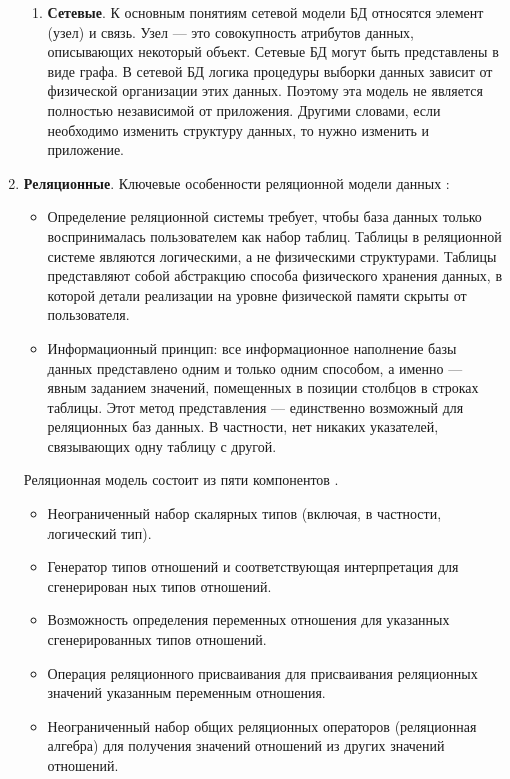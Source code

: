 \begin{enumerate}[label*=\arabic*.]
\begin{enumerate}[label*=\arabic*.]
		\item \textbf{Сетевые}. \newline
		К основным понятиям сетевой модели БД относятся элемент (узел) и связь. Узел --- это совокупность атрибутов данных, описывающих некоторый объект. Сетевые БД могут быть представлены в виде графа. В сетевой БД логика процедуры выборки данных зависит от физической организации этих данных. Поэтому эта модель не является полностью независимой от приложения. Другими словами, если необходимо изменить структуру данных, то нужно изменить и приложение.
		
	\end{enumerate}
	
	\item \textbf{Реляционные}. \newline
	Ключевые особенности реляционной модели данных \cite{Date_old}:
	
	\begin{itemize}[label*=---]
		\item  Определение реляционной системы требует, чтобы база данных только воспринималась пользователем как набор таблиц. Таблицы в реляционной системе являются логическими, а не физическими структурами. Таблицы представляют собой абстракцию способа физического хранения данных, в которой детали реализации на уровне физической памяти скрыты от пользователя.
		\item  Информационный принцип: все информационное наполнение базы данных представлено одним и только одним способом, а именно --- явным заданием значений, помещенных в позиции столбцов в строках таблицы. Этот метод представления --- единственно возможный для реляционных баз данных. В частности, нет никаких указателей, связывающих одну таблицу с другой.
		
	\end{itemize}
	
	Реляционная модель состоит из пяти компонентов \cite{Date_old}.
	
	\begin{itemize}[label*=---]
		\item  Неограниченный набор скалярных типов (включая, в частности, логический тип).
		\item  Генератор типов отношений и соответствующая интерпретация для сгенерирован ных типов отношений.
		\item  Возможность определения переменных отношения для указанных сгенерированных типов отношений.
		\item  Операция реляционного присваивания для присваивания реляционных значений указанным переменным отношения.
		\item  Неограниченный набор общих реляционных операторов (реляционная алгебра) для получения значений отношений из других значений отношений.
		

\end{itemize}
\end{enumerate}
